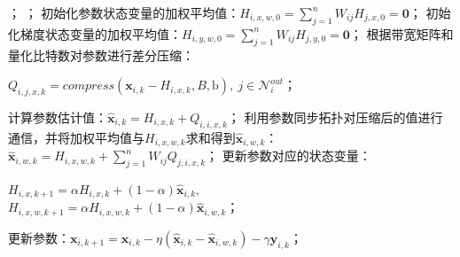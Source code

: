\begin{center}
    \begin{algorithm}[!htbp]
            \caption{节点$i$上的BA-QDSGT算法的伪代码} 
            \label{Algorithm-BA-QDSGT} 
            \begin{algorithmic}[1]
            ；
            ；
            \STATE 初始化参数状态变量的加权平均值：$H_{i,x,w,0}=\sum_{j=1}^n{W_{ij}}H_{j,x,0}=\mathbf{0}$；
            \STATE 初始化梯度状态变量的加权平均值：$H_{i,y,w,0}=\sum_{j=1}^n{W_{ij}}H_{j,y,0}=\mathbf{0}$；
                \STATE 根据带宽矩阵和量化比特数对参数进行差分压缩：\\\begin{center}$Q_{i,j,x,k}=compress\left( \boldsymbol{x}_{i,k}-H_{i,x,k},B,\mathrm{b} \right) ,\ j\in \mathcal{N} _{i}^{out} $；\end{center}
                \STATE 计算参数估计值：$\hat{\boldsymbol{x}}_{i,k}=H_{i,x,k}+Q_{i,i,x,k}$；
                \STATE 利用参数同步拓扑对压缩后的值进行通信，并将加权平均值与$H_{i,x,w,k}$求和得到$\hat{\boldsymbol{x}}_{i,w,k}$：$\hat{\boldsymbol{x}}_{i,w,k}=H_{i,x,w,k}+\sum_{j=1}^n{W_{ij}}Q_{j,i,x,k}$；
                \STATE 更新参数对应的状态变量：\\\begin{center}$H_{i,x,k+1}=\alpha H_{i,x,k}+\left( 1-\alpha \right) \hat{\boldsymbol{x}}_{i,k},$\\$H_{i,x,w,k+1}=\alpha H_{i,x,w,k}+\left( 1-\alpha \right) \hat{\boldsymbol{x}}_{i,w,k}$；\end{center}
                \STATE 更新参数：$\boldsymbol{x}_{i,k+1}=\boldsymbol{x}_{i,k}-\eta \left( \hat{\boldsymbol{x}}_{i,k}-\hat{\boldsymbol{x}}_{i,w,k} \right) -\gamma \boldsymbol{y}_{i,k}$；


\end{algorithmic}
\end{algorithm}
\end{center}
